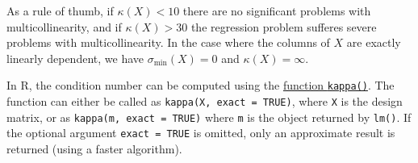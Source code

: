 \documentclass[
  a4paper,
]{article}
\theoremstyle{definition}
\theoremstyle{definition}
\theoremstyle{definition}
\theoremstyle{definition}
\theoremstyle{remark}
\begin{document}
As a rule of thumb, if \(\kappa(X) < 10\) there are no significant problems
with multicollinearity, and if \(\kappa(X) > 30\) the regression problem
sufferes severe problems with multicollinearity. In the case where the
columns of \(X\) are exactly linearly dependent, we have \(\sigma_\mathrm{min}(X)
= 0\) and \(\kappa(X) = \infty\).

In R, the condition number can be computed using the
\href{https://rdrr.io/r/base/kappa.html}{function \texttt{kappa()}}. The function
can either be called as \texttt{kappa(X,\ exact\ =\ TRUE)},
where \texttt{X} is the design matrix,
or as \texttt{kappa(m,\ exact\ =\ TRUE)}
where \texttt{m} is the object returned by \texttt{lm()}. If the optional
argument \texttt{exact\ =\ TRUE} is omitted, only an approximate result
is returned (using a faster algorithm).
\end{document}
